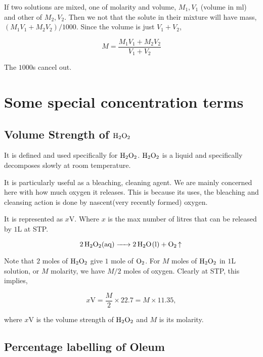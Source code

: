 If two solutions are mixed, one of molarity and volume, \(M_1, V_1\) (volume 
in \si{\ml}) and other 
of \(M_2, V_2\). Then we not that the solute in their mixture 
will have mass, \((M_1V_1 + M_2V_2)/1000\). Since the volume 
is just \(V_1+V_2\), 

\begin{equation}
  M = \frac{M_1V_1 + M_2V_2}{V_1 + V_2}
\end{equation}

The \(1000\)s cancel out.

\section{Some special concentration terms}

\subsection{Volume Strength of \(\ce{H2O2}\)}

It is defined and used specifically for \(\ce{H2O2}\). \(\ce{H2O2}\) is a liquid 
and specifically decomposes slowly at room temperature. 

It is particularly useful as a bleaching, cleaning agent. We are 
mainly concerned here with how much oxygen it releases. This is because 
its uses, the bleaching and cleansing action is done by nascent(very recently formed) oxygen.

It is represented as \(x\)V. Where \(x\) is the max number of litres that can be released 
by \(1\)\si{\liter} at STP.

\begin{equation*}
  \ce{2 H2O2(aq) -> 2H2O(l) + O2 (^) }
\end{equation*}

Note that \(2\) moles of \(\ce{H2O2}\) give \(1\) mole of \(\ce{O2}\). For \(M\) moles of 
\(\ce{H2O2}\) in \(1\)\si{\liter} solution, or \(M\) molarity, we have \(M/2\) moles of oxygen. Clearly at STP, this implies, 

\begin{equation}
  x \text{V} = \frac{M}{2} \times 22.7 = M \times 11.35,
\end{equation}

where \(x\)V is the volume strength of \(\ce{H2O2}\) and \(M\) is its molarity.

\subsection{Percentage labelling of Oleum}

